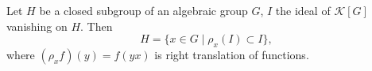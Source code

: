 Let $H$ be a closed subgroup of an algebraic group $G$, $I$ the ideal of $\mathcal{K}[G]$ vanishing on $H$. Then
$$H = \{x \in G \mid \rho_x(I) \subset I\},$$
where $(\rho_x f)(y) = f(yx)$ is right translation of functions.
